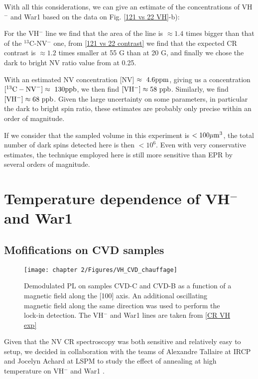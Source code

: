 \documentclass[a4paper,11pt]{report}
\begin{document}
\begin{refsection}
With all this considerations, we can give an estimate of the concentrations of VH$^-$ and War1 based on the data on Fig. \ref{121 vs 22 VH}-b): 

For the VH$^-$ line we find that the area of the line is $\approx 1.4$ times bigger than that of the $^{13}$C-NV$^-$ one, from \ref{121 vs 22 contrast} we find that the expected CR contrast is $\approx 1.2$ times smaller at 55 G than at 20 G, and finally we chose the dark to bright NV ratio value from \citep{choi2017depolarization} at 0.25.

With an estimated NV concentration [NV] $\approx\ \rm 4.6 ppm$, giving us a concentration $[^{13}\rm{C-NV}^-]\approx \ \rm 130 ppb$, we then find $[\rm VH^-] \approx 58\ \rm ppb$. Similarly, we find $[\rm VH^-] \approx 68\ \rm ppb$. Given the large uncertainty on some parameters, in particular the dark to bright spin ratio, these estimates are probably only precise within an order of magnitude.

If we consider that the sampled volume in this experiment is $< 100 \mu \rm{m}^3$, the total number of dark spins detected here is then $< 10^6$. Even with very conservative estimates, the technique employed here is still more sensitive than EPR by several orders of magnitude.

\section{Temperature dependence of VH$^-$ and War1}


\subsection{Mofifications on CVD samples}
\begin{figure}[h]
\centering
\texttt{[image: chapter 2/Figures/VH\_CVD\_chauffage]}
\caption{Demodulated PL on samples CVD-C and CVD-B as a function of a magnetic field along the [100] axis. An additional oscillating magnetic field along the same direction was used to perform the lock-in detection. The VH$^-$ and War1 lines are taken from \ref{CR VH exp}}
\label{chauffage CVD}
\end{figure}

Given that the NV CR spectroscopy was both sensitive and relatively easy to setup, we decided in collaboration with the teams of Alexandre Tallaire at IRCP and Jocelyn Achard at LSPM to study the effect of annealing at high temperature on VH$^-$ and War1 \citep{ngambou2022improving}.


\end{refsection}
\end{document}
